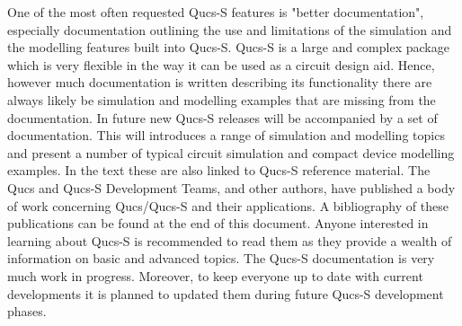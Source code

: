 \documentclass[10pt, a4paper]{report}
\begin{document}
\noindent One of the most often requested Qucs-S features is "better documentation", especially documentation outlining the use and limitations of the simulation and the modelling features built into Qucs-S.  Qucs-S is a large and complex package which is very flexible in the way it can be used as a circuit design aid. Hence, however much documentation is written describing its functionality there are always likely be simulation and modelling examples that are missing from the documentation. In future new Qucs-S releases will be accompanied by a set of documentation. This will introduces a range of simulation and modelling topics and present a number of typical circuit simulation and compact device modelling examples. In the text these are also linked to Qucs-S reference material.  The Qucs and Qucs-S Development Teams, and other authors, have published a body of work concerning Qucs/Qucs-S and their applications. A bibliography of these publications can be found at the end of this document. Anyone interested in learning about Qucs-S is recommended to read them as they provide a wealth of information on basic and advanced topics.  The Qucs-S documentation is very much work in progress.  Moreover, to keep everyone up to date with current developments it is planned to updated them during future Qucs-S development phases. 
\end{document}
